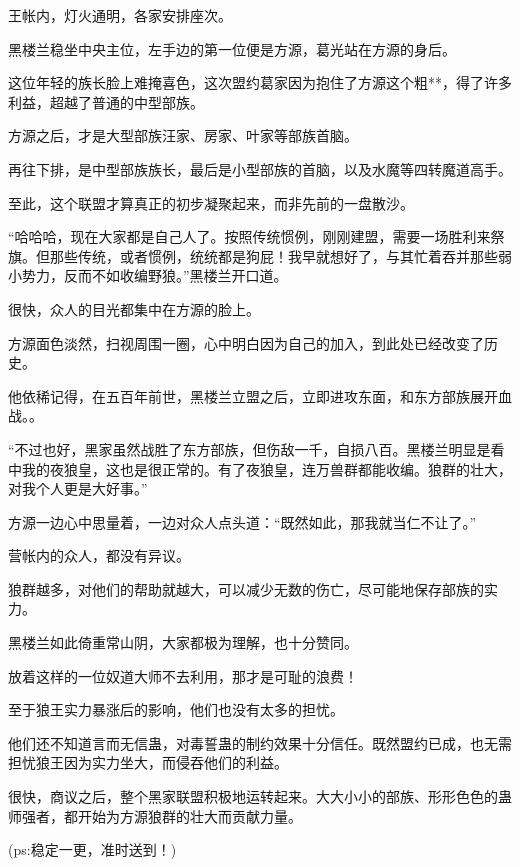 \begin{this_body}
王帐内，灯火通明，各家安排座次。

黑楼兰稳坐中央主位，左手边的第一位便是方源，葛光站在方源的身后。

这位年轻的族长脸上难掩喜色，这次盟约葛家因为抱住了方源这个粗**，得了许多利益，超越了普通的中型部族。

方源之后，才是大型部族汪家、房家、叶家等部族首脑。

再往下排，是中型部族族长，最后是小型部族的首脑，以及水魔等四转魔道高手。

至此，这个联盟才算真正的初步凝聚起来，而非先前的一盘散沙。

“哈哈哈，现在大家都是自己人了。按照传统惯例，刚刚建盟，需要一场胜利来祭旗。但那些传统，或者惯例，统统都是狗屁！我早就想好了，与其忙着吞并那些弱小势力，反而不如收编野狼。”黑楼兰开口道。

很快，众人的目光都集中在方源的脸上。

方源面色淡然，扫视周围一圈，心中明白因为自己的加入，到此处已经改变了历史。

他依稀记得，在五百年前世，黑楼兰立盟之后，立即进攻东面，和东方部族展开血战。。

“不过也好，黑家虽然战胜了东方部族，但伤敌一千，自损八百。黑楼兰明显是看中我的夜狼皇，这也是很正常的。有了夜狼皇，连万兽群都能收编。狼群的壮大，对我个人更是大好事。”

方源一边心中思量着，一边对众人点头道：“既然如此，那我就当仁不让了。”

营帐内的众人，都没有异议。

狼群越多，对他们的帮助就越大，可以减少无数的伤亡，尽可能地保存部族的实力。

黑楼兰如此倚重常山阴，大家都极为理解，也十分赞同。

放着这样的一位奴道大师不去利用，那才是可耻的浪费！

至于狼王实力暴涨后的影响，他们也没有太多的担忧。

他们还不知道言而无信蛊，对毒誓蛊的制约效果十分信任。既然盟约已成，也无需担忧狼王因为实力坐大，而侵吞他们的利益。

很快，商议之后，整个黑家联盟积极地运转起来。大大小小的部族、形形色色的蛊师强者，都开始为方源狼群的壮大而贡献力量。

(ps:稳定一更，准时送到！)

\end{this_body}

